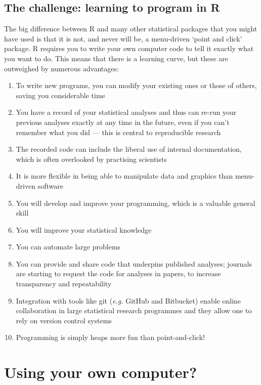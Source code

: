 \documentclass[]{book}
\theoremstyle{definition}
\theoremstyle{definition}
\theoremstyle{definition}
\theoremstyle{remark}
\begin{document}
\subsection{The challenge: learning to program in
R}\label{the-challenge-learning-to-program-in-r}

The big difference between R and many other statistical packages that
you might have used is that it is not, and never will be, a menu-driven
`point and click' package. R requires you to write your own computer
code to tell it exactly what you want to do. This means that there is a
learning curve, but these are outweighed by numerous advantages:

\begin{enumerate}
\def\labelenumi{\arabic{enumi}.}
\item
  To write new programs, you can modify your existing ones or those of
  others, saving you considerable time
\item
  You have a record of your statistical analyses and thus can re-run
  your previous analyses exactly at any time in the future, even if you
  can't remember what you did --- this is central to reproducible
  research
\item
  The recorded code can include the liberal use of internal
  documentation, which is often overlooked by practising scientists
\item
  It is more flexible in being able to manipulate data and graphics than
  menu-driven software
\item
  You will develop and improve your programming, which is a valuable
  general skill
\item
  You will improve your statistical knowledge
\item
  You can automate large problems
\item
  You can provide and share code that underpins published analyses;
  journals are starting to request the code for analyses in papers, to
  increase transparency and repeatability
\item
  Integration with tools like git (\emph{e.g.} GitHub and Bitbucket)
  enable online collaboration in large statistical research programmes
  and they allow one to rely on version control systems
\item
  Programming is simply heaps more fun than point-and-click!
\end{enumerate}

\section{Using your own computer?}\label{using-your-own-computer}
\end{document}
